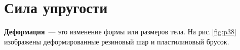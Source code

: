 \documentclass[main.tex]{subfiles}
\begin{document}



\pagestyle{empty}

 

\setcounter{section}{20
}
\addtocounter{section}{-1} 

\section{Сила упругости}

\textbf{Деформация}~--- это изменение формы или размеров тела. На рис.\,\ref{fig:p38} изображены деформированные резиновый шар и пластилиновый брусок.
\end{document}
